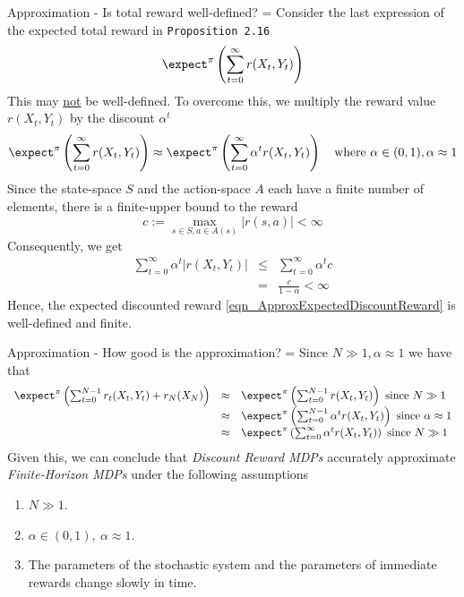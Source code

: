 \documentclass[11pt,a4paper]{article}
\begin{document}
  \begin{remark}{Approximation - Is total reward well-defined?}
    \everymath={\displaystyle}
    Consider the last expression of the expected total reward in \texttt{Proposition 2.16}
    \[ \expect^\pi\left(\sum_{t=0}^\infty r(X_t,Y_t)\right)\]
    This may \underline{not} be well-defined. To overcome this, we multiply the reward value $r(X_t,Y_t)$ by the discount $\alpha^t$
    \begin{equation}
      \expect^\pi\left(\sum_{t=0}^\infty r(X_t,Y_t)\right)\approx\expect^\pi\left(\sum_{t=0}^\infty\alpha^tr(X_t,Y_t)\right)\quad\text{where }\alpha\in(0,1),\alpha\approx1
      \label{eqn_ApproxExpectedDiscountReward}
    \end{equation}
    Since the state-space $S$ and the action-space $A$ each have a finite number of elements, there is a finite-upper bound to the reward
    \[ c:=\max_{s\in S,a\in A(s)}|r(s,a)|<\infty \]
    Consequently, we get
    \[\begin{array}{rcl}
      \sum_{t=0}^\infty\alpha^t|r(X_t,Y_t)|&\leq&\sum_{t=0}^\infty\alpha^tc\\
      &=&\frac{c}{1-\alpha}<\infty
    \end{array}\]
    Hence, the expected discounted reward \ref{eqn_ApproxExpectedDiscountReward} is well-defined and finite.
  \end{remark}

  \begin{remark}{Approximation - How good is the approximation?}
    \everymath={\displaystyle}
    Since $N\gg1,\alpha\approx1$ we have that
    \[\begin{array}{rcl}
      \expect^\pi\left(\sum_{t=0}^{N-1}r_t(X_t,Y_t)+r_N(X_N)\right)&\approx&\expect^\pi\left(\sum_{t=0}^{N-1}r(X_t,Y_t)\right)\text{ since }N\gg1\\
      &\approx&\expect^\pi\left(\sum_{t=0}^{N-1}\alpha^tr(X_t,Y_t)\right)\text{ since }\alpha\approx1\\
      &\approx&\expect^\pi\left(\sum_{t=0}^\infty \alpha^tr(X_t,Y_t)\right)\text{ since }N\gg1\\
    \end{array}\]
    Given this, we can conclude that \textit{Discount Reward MDPs} accurately approximate \textit{Finite-Horizon MDPs} under the following assumptions
    \begin{enumerate}
      \item $N\gg1$.
      \item $\alpha\in(0,1),\ \alpha\approx1$.
      \item The parameters of the stochastic system and the parameters of immediate rewards change slowly in time.
    \end{enumerate}
  \end{remark}
\end{document}

